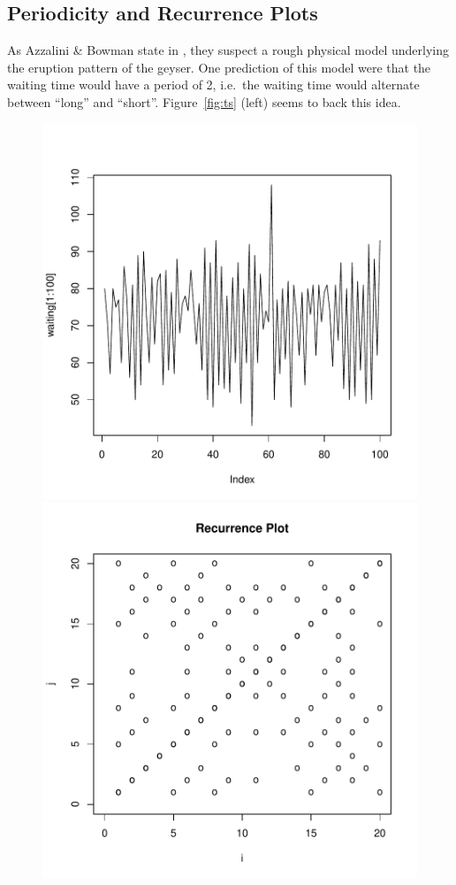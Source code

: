 \documentclass[english,final]{scrartcl}
\begin{document}
\subsection{Periodicity and Recurrence Plots}
\label{sec:recurrence}

As Azzalini \& Bowman state in \cite{data}, they suspect a rough physical model underlying the eruption pattern of the geyser. One prediction of this model were that the waiting time would have a period of 2, i.e.\ the waiting time would alternate between \enquote{long} and \enquote{short}. Figure~\ref{fig:ts} (left) seems to back this idea. 

\begin{figure}[htbp]
\centering
\includegraphics{Geyser-Analysis-plot_wait_period}
\hspace{1cm}
\includegraphics{Geyser-Analysis-rec_waiting_plot}

\end{figure}
\end{document}
